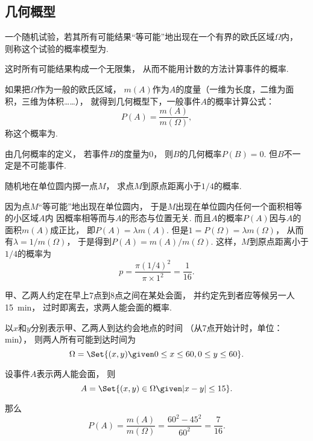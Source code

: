 \subsection{几何概型}
\begin{definition}
一个随机试验，若其所有可能结果“等可能”地出现在一个有界的欧氏区域\(\Omega\)内，
则称这个试验的概率模型为.
\end{definition}
这时所有可能结果构成一个无限集，
从而不能用计数的方法计算事件的概率.

\begin{definition}
如果把\(\Omega\)作为一般的欧氏区域，
\(m(A)\)作为\(A\)的度量（一维为长度，二维为面积，三维为体积……），
就得到几何概型下，一般事件\(A\)的概率计算公式：\[
	P(A) = \frac{m(A)}{m(\Omega)},
\]
称这个概率为.
\end{definition}
由几何概率的定义，
若事件\(B\)的度量为0，
则\(B\)的几何概率\(P(B)=0\).
但\(B\)不一定是不可能事件.

\begin{example}
随机地在单位圆内掷一点\(M\)，
求点\(M\)到原点距离小于\(1/4\)的概率.
\begin{solution}
因为点\(M\)“等可能”地出现在单位圆内，
于是\(M\)出现在单位圆内任何一个面积相等的小区域\(A\)内
因概率相等而与\(A\)的形态与位置无关.
而且\(A\)的概率\(P(A)\)因与\(A\)的面积\(m(A)\)成正比，
即\(P(A)=\lambda m(A)\).
但是\(1 = P(\Omega) = \lambda m(\Omega)\)，
从而有\(\lambda = 1/m(\Omega)\)，
于是得到\(P(A) = m(A)/m(\Omega)\).
这样，\(M\)到原点距离小于\(1/4\)的概率为\[
	p = \frac{\pi (1/4)^2}{\pi \times 1^2} = \frac{1}{16}.
\]
\end{solution}
\end{example}

\begin{example}[会面问题]
甲、乙两人约定在早上7点到8点之间在某处会面，
并约定先到者应等候另一人15~min，
过时即离去，求两人能会面的概率.
\begin{solution}
以\(x\)和\(y\)分别表示甲、乙两人到达约会地点的时间
（从7点开始计时，单位：min），
则两人所有可能到达时间为\[
	\Omega = \Set{ (x,y) \given 0 \leq x \leq 60, 0 \leq y \leq 60 }.
\]

设事件\(A\)表示两人能会面，
则\[
	A = \Set{ (x,y)\in\Omega \given \abs{x-y} \leq 15 }.
\]

那么\[
	P(A) = \frac{m(A)}{m(\Omega)}
	= \frac{60^2 - 45^2}{60^2}
	= \frac{7}{16}.
\]
\end{solution}
\end{example}

